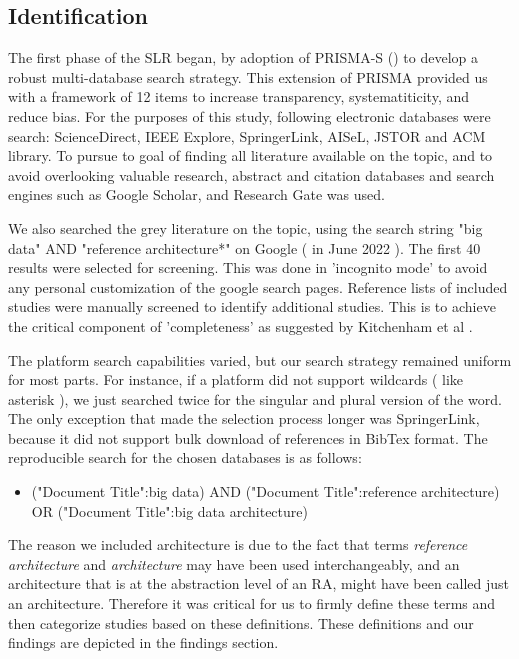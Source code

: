 \documentclass[review]{elsarticle}
\begin{document}
\subsection{Identification}

The first phase of the SLR began, by adoption of PRISMA-S (\cite{rethlefsen2021prisma}) to develop a robust multi-database search strategy. This extension of PRISMA provided us with a framework of 12 items to increase transparency, systematiticity, and reduce bias. For the purposes of this study, following electronic databases were search: ScienceDirect, IEEE Explore, SpringerLink, AISeL, JSTOR and ACM library. To pursue to goal of finding all literature available on the topic, and to avoid overlooking valuable research, abstract and citation databases and search engines such as Google Scholar, and Research Gate was used.

We also searched the grey literature on the topic, using the search string "big data" AND "reference architecture*" on Google ( in June 2022 ). The first 40 results were selected for screening. This was done in 'incognito mode' to avoid any personal customization of the google search pages. Reference lists of included studies were manually screened to identify additional studies. This is to achieve the critical component of 'completeness' as suggested by Kitchenham et al \cite{kitchenham2015evidence}.

The platform search capabilities varied, but our search strategy remained uniform for most parts. For instance, if a platform did not support wildcards ( like asterisk ), we just searched twice for the singular and plural version of the word. The only exception that made the selection process longer was SpringerLink, because it did not support bulk download of references in BibTex format. The reproducible search for the chosen databases is as follows: 

\begin{itemize}
    \item ("Document Title":big data) AND ("Document Title":reference architecture) OR ("Document Title":big data architecture)
\end{itemize}

The reason we included architecture is due to the fact that terms \emph{reference architecture} and \emph{architecture} may have been used interchangeably, and an architecture that is at the abstraction level of an RA, might have been called just an architecture. Therefore it was critical for us to firmly define these terms and then categorize studies based on these definitions. These definitions and our findings are depicted in the findings section.
\end{document}
